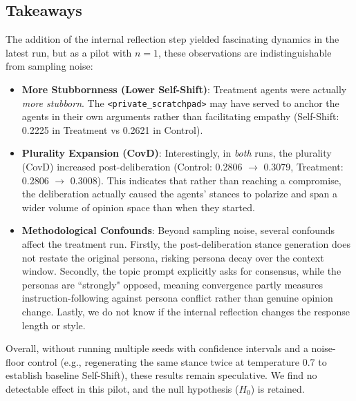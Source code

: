 \documentclass[titlepage]{article}
\begin{document}
\subsection{Takeaways}
The addition of the internal reflection step yielded fascinating dynamics in the latest run, but as a pilot with $n=1$, these observations are indistinguishable from sampling noise:
\begin{itemize}
    \item \textbf{More Stubbornness (Lower Self-Shift)}: Treatment agents were actually \textit{more stubborn}. The \verb|<private_scratchpad>| may have served to anchor the agents in their own arguments rather than facilitating empathy (Self-Shift: 0.2225 in Treatment vs 0.2621 in Control). 
    \item \textbf{Plurality Expansion (CovD)}: Interestingly, in \textit{both} runs, the plurality (CovD) increased post-deliberation (Control: 0.2806 $\rightarrow$ 0.3079, Treatment: 0.2806 $\rightarrow$ 0.3008). This indicates that rather than reaching a compromise, the deliberation actually caused the agents' stances to polarize and span a wider volume of opinion space than when they started.
    \item \textbf{Methodological Confounds}: Beyond sampling noise, several confounds affect the treatment run. Firstly, the post-deliberation stance generation does not restate the original persona, risking persona decay over the context window. Secondly, the topic prompt explicitly asks for consensus, while the personas are ``strongly" opposed, meaning convergence partly measures instruction-following against persona conflict rather than genuine opinion change. Lastly, we do not know if the internal reflection changes the response length or style. 
\end{itemize}

Overall, without running multiple seeds with confidence intervals and a noise-floor control (e.g., regenerating the same stance twice at temperature 0.7 to establish baseline Self-Shift), these results remain speculative. We find no detectable effect in this pilot, and the null hypothesis ($H_0$) is retained.
\end{document}
